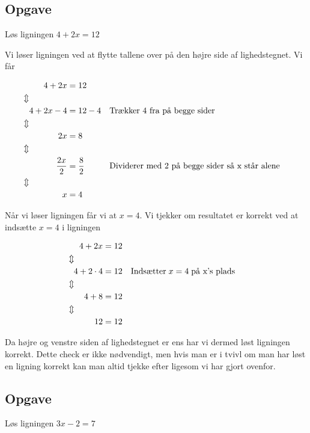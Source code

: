 \subsection{Opgave}
Løs ligningen $4 + 2x = 12$

Vi løser ligningen ved at flytte tallene over på den højre side af lighedstegnet. Vi får

\begin{align*}
4 + 2x &= 12\\
\Updownarrow \hspace*{16mm} &\\
4 + 2x - 4 &= 12 - 4 && \text{Trækker 4 fra på begge sider}\\
\Updownarrow \hspace*{16mm} &\\
2x &= 8\\
\Updownarrow \hspace*{16mm} &\\
\frac{2x}{2} &= \frac{8}{2} && \text{Dividerer med 2 på begge sider så x står alene}\\
\Updownarrow \hspace*{16mm} &\\
x &= 4
\end{align*}

Når vi løser ligningen får vi at $x = 4$. Vi tjekker om resultatet er korrekt ved at indsætte $x = 4$ i ligningen

\begin{align*}
4 + 2x &= 12\\
\Updownarrow \hspace*{12mm} &\\
4 + 2\cdot 4 &= 12 && \text{Indsætter} \hspace*{1mm} x = 4 \hspace*{1mm} \text{på x's plads}\\
\Updownarrow \hspace*{12mm} &\\
4 + 8 &= 12\\
\Updownarrow \hspace*{12mm} &\\
12 &= 12
\end{align*}

Da højre og venstre siden af lighedstegnet er ens har vi dermed løst ligningen korrekt. Dette check er ikke nødvendigt, men hvis man er i tvivl om man har løst en ligning korrekt kan man altid tjekke efter ligesom vi har gjort ovenfor.

\subsection{Opgave}
Løs ligningen $3x - 2 = 7$

